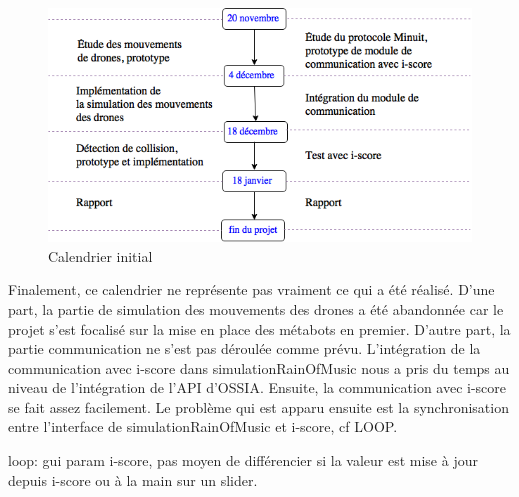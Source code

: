 \begin{figure}[H]
  \begin{center}
  	\includegraphics[scale=0.7]{imgs/calendrier.png}
  	\caption{Calendrier initial}
  	\label{cal}
  \end{center}
\end{figure}

Finalement, ce calendrier ne représente pas vraiment ce qui a été réalisé. D'une part, la partie de simulation des mouvements des drones a été abandonnée car le projet s'est focalisé sur la mise en place des métabots en premier. D'autre part, la partie communication ne s'est pas déroulée comme prévu. L'intégration de la communication avec i-score dans simulationRainOfMusic nous a pris du temps au niveau de l'intégration de l'API d'OSSIA. Ensuite, la communication avec i-score se fait assez facilement. Le problème qui est apparu ensuite est la synchronisation entre l'interface de simulationRainOfMusic et i-score, cf LOOP. 

loop: gui param i-score, pas moyen de différencier si la valeur est mise à jour depuis i-score ou à la main sur un slider.
